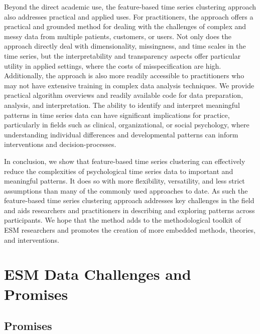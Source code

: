 \documentclass[man, 12pt, a4paper, floatsintext]{apa7}
\theoremstyle{break}
\theoremstyle{plain}
\begin{document}
Beyond the direct academic use, the feature-based time series clustering approach also addresses practical and applied uses. For practitioners, the approach offers a practical and grounded method for dealing with the challenges of complex and messy data from multiple patients, customers, or users. Not only does the approach directly deal with dimensionality, missingness, and time scales in the time series, but the interpretability and transparency aspects offer particular utility in applied settings, where the costs of misspecification are high. Additionally, the approach is also more readily accessible to practitioners who may not have extensive training in complex data analysis techniques. We provide practical algorithm overviews and readily available code for data preparation, analysis, and interpretation. The ability to identify and interpret meaningful patterns in time series data can have significant implications for practice, particularly in fields such as clinical, organizational, or social psychology, where understanding individual differences and developmental patterns can inform interventions and decision-processes.

In conclusion, we show that feature-based time series clustering can effectively reduce the complexities of psychological time series data to important and meaningful patterns. It does so with more flexibility, versatility, and less strict assumptions than many of the commonly used approaches to date. As such the feature-based time series clustering approach addresses key challenges in the field and aids researchers and practitioners in describing and exploring patterns across participants. We hope that the method adds to the methodological toolkit of ESM researchers and promotes the creation of more embedded methods, theories, and interventions.


%




\printbibliography

\appendix

\section{ESM Data Challenges and Promises}
\label{app:ChallengesAppendix}

\subsection{Promises}
\end{document}
